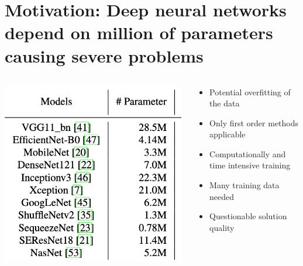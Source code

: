 \documentclass[t]{beamer}
\begin{document}
\section{Motivation: Deep neural networks depend on million of parameters causing severe problems}
\begin{frame}
\begin{columns}[c]

\begin{column}{0.5\textwidth}
\begin{center}
\includegraphics[width=0.99\textwidth]{parameters.png}
\end{center}
\end{column}

\begin{column}{0.5\textwidth}
\begin{itemize}
\item Potential overfitting of the data \vspace{1cm}
\item Only first order methods applicable \vspace{1cm}
\item Computationally and time intensive training \vspace{1cm} 
\item Many training data needed \vspace{1cm}
\item Questionable solution quality  
\end{itemize}
\end{column}

\end{columns}
\end{frame}
\end{document}
